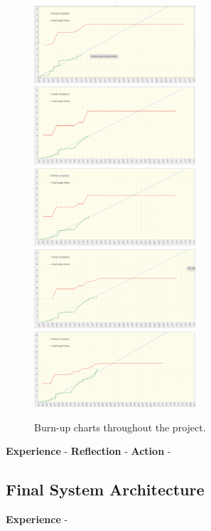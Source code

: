   \begin{figure}[H]
    \centering
    \includegraphics[width=6cm]{assets/outputs/burnups/01-16.png}
    \includegraphics[width=6cm]{assets/outputs/burnups/01-30.png}
    \includegraphics[width=6cm]{assets/outputs/burnups/02-05.png}
    \includegraphics[width=6cm]{assets/outputs/burnups/02-14.png}
    \includegraphics[width=6cm]{assets/outputs/burnups/02-27.png}
    \caption{Burn-up charts throughout the project.}
    \label{fig:burnups}
  \end{figure}

  \textbf{Experience} -
  \textbf{Reflection} -
  \textbf{Action} -

  \newpage
  \subsection{Final System Architecture}

  \textbf{Experience} - 

